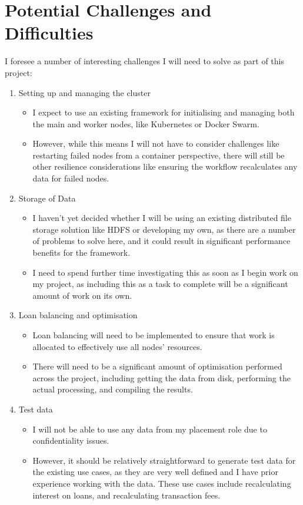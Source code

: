\documentclass[12pt]{article}
\begin{document}
	\section{Potential Challenges and Difficulties}
	
	I foresee a number of interesting challenges I will need to solve as part of this project:
	
	\begin{enumerate}
		\item Setting up and managing the cluster
		\begin{itemize}
			\item I expect to use an existing framework for initialising and managing both the main and worker nodes, like Kubernetes or Docker Swarm.
			\item However, while this means I will not have to consider challenges like restarting failed nodes from a container perspective, there will still be other resilience considerations like ensuring the workflow recalculates any data for failed nodes. %
		\end{itemize}
		\item Storage of Data %
		\begin{itemize}
			\item I haven't yet decided whether I will be using an existing distributed file storage solution like HDFS or developing my own, as there are a number of problems to solve here, and it could result in significant performance benefits for the framework.
			\item I need to spend further time investigating this as soon as I begin work on my project, as including this as a task to complete will be a significant amount of work on its own.
		\end{itemize}
		\item Loan balancing and optimisation
		\begin{itemize}
			\item Loan balancing will need to be implemented to ensure that work is allocated to effectively use all nodes' resources.
			\item There will need to be a significant amount of optimisation performed across the project, including getting the data from disk, performing the actual processing, and compiling the results.
		\end{itemize}
		\item Test data
		\begin{itemize}
			\item I will not be able to use any data from my placement role due to confidentiality issues.
			\item However, it should be relatively straightforward to generate test data for the existing use cases, as they are very well defined and I have prior experience working with the data. These use cases include recalculating interest on loans, and recalculating transaction fees.
		\end{itemize}
	\end{enumerate}
	
\end{document}
